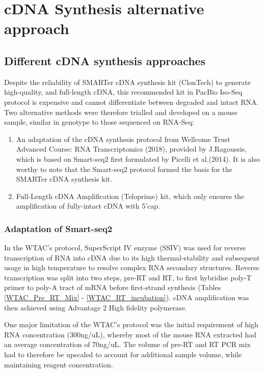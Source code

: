 \chapter{cDNA Synthesis alternative approach}
\label{ch:alt_cDNA}

\section{Different cDNA synthesis approaches}
Despite the reliability of SMARTer cDNA synthesis kit (ClonTech) to generate high-quality, and full-length cDNA, this recommended kit in PacBio Iso-Seq protocol is expensive and cannot differentiate between degraded and intact RNA. Two alternative methods were therefore trialled and developed on a mouse sample, similar in genotype to those sequenced on RNA-Seq:

\begin{enumerate}
	\item An adaptation of the cDNA synthesis protocol from Wellcome Trust Advanced Course: RNA Transcriptomics (2018), provided by J.Ragoussis, which is based on Smart-seq2 first formulated by Picelli et al.(2014). It is also worthy to note that the Smart-seq2 protocol formed the basis for the SMARTer cDNA synthesis kit. 
	\item Full-Length cDNA Amplification (Teloprime) kit, which only ensures the amplification of fully-intact cDNA with 5'cap.    
\end{enumerate}

\subsection{Adaptation of Smart-seq2}
In the WTAC's protocol, SuperScript IV enzyme (SSIV) was used for reverse transcription of RNA into cDNA due to its high thermal-stability and subsequent usage in high temperature to resolve complex RNA secondary structures. Reverse transcription was split into two steps, pre-RT and RT, to first hybridise poly-T primer to poly-A tract of mRNA before first-strand synthesis (Tables \ref{WTAC_Pre_RT_Mix} - \ref{WTAC_RT_incubation}). cDNA amplification was then achieved using Advantage 2 High fidelity polymerase.

One major limitation of the WTAC's protocol was the initial requirement of high RNA concentration (300ng/uL), whereby most of the mouse RNA extracted had an average concentration of 70ng/uL. The volume of pre-RT and RT PCR mix had to therefore be upscaled to account for additional sample volume, while maintaining reagent concentration. 



